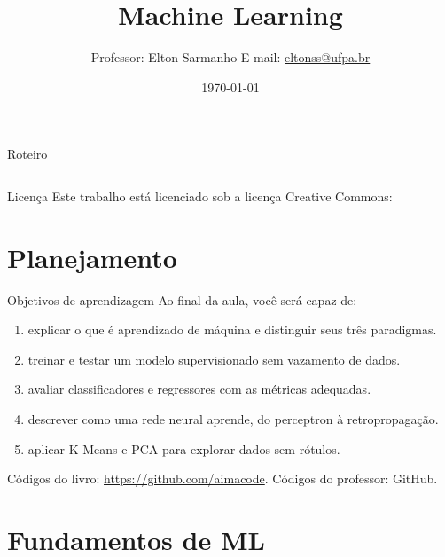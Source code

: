 \documentclass[10pt]{beamer}
\title[]{Machine Learning}
\author[Elton Sarmanho]{
Professor: Elton Sarmanho\inst{1}
\newline
E-mail: \href{mailto:eltonss@ufpa.br}{eltonss@ufpa.br}\newline
\href{https://github.com/eltonsarmanho}{\faGithub} \href{https://www.linkedin.com/in/elton-sarmanho-836553185/}{\faLinkedin}\\
\ccbyncsa
}
\institute[UFPA]{
   \inst{1}%
     Faculdade de Sistemas de Informação - UFPA/CUNTINS
     }
\date{\today}
\begin{document}
\begin{frame}
\titlepage
\end{frame}

\begin{frame}{Roteiro}
\begin{columns}[T]
\tableofcontents[sections={1-6}, hideallsubsections]
\tableofcontents[sections={7-11}, hideallsubsections]
\end{columns}
\end{frame}

\begin{frame}{Licença}
    Este trabalho está licenciado sob a licença Creative Commons:

    \bigskip
    \ccbyncsa
\end{frame}

\section{Planejamento}

\begin{frame}{Objetivos de aprendizagem}
Ao final da aula, você será capaz de:
\begin{enumerate}
 \item explicar o que é aprendizado de máquina e distinguir seus três paradigmas.
 \item treinar e testar um modelo supervisionado sem vazamento de dados.
 \item avaliar classificadores e regressores com as métricas adequadas.
 \item descrever como uma rede neural aprende, do perceptron à retropropagação.
 \item aplicar K-Means e PCA para explorar dados sem rótulos.
\end{enumerate}
\vspace{2mm}
\small Códigos do livro: \url{https://github.com/aimacode}. Códigos do professor: GitHub.
\end{frame}

\section{Fundamentos de ML}
\end{document}
